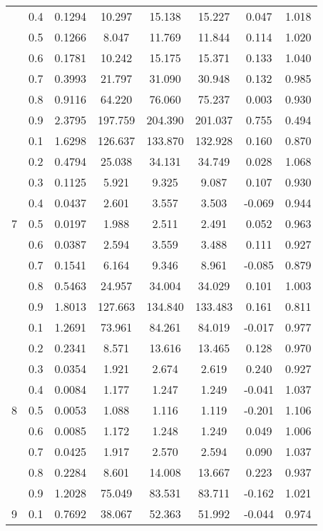 \documentclass[11pt,a4paper]{report}
\begin{document}
\begin{longtable}{ | c | c || c | c | c | c | c | c | }
 & 0.4 & 0.1294 & 10.297 & 15.138 & 15.227 & 0.047 & 1.018 \\
 & 0.5 & 0.1266 & 8.047 & 11.769 & 11.844 & 0.114 & 1.020 \\
 & 0.6 & 0.1781 & 10.242 & 15.175 & 15.371 & 0.133 & 1.040 \\
 & 0.7 & 0.3993 & 21.797 & 31.090 & 30.948 & 0.132 & 0.985 \\
 & 0.8 & 0.9116 & 64.220 & 76.060 & 75.237 & 0.003 & 0.930 \\
 & 0.9 & 2.3795 & 197.759 & 204.390 & 201.037 & 0.755 & 0.494 \\
 \hline
\multirow{9}{*}{7} & 0.1 & 1.6298 & 126.637 & 133.870 & 132.928 & 0.160 & 0.870 \\
 & 0.2 & 0.4794 & 25.038 & 34.131 & 34.749 & 0.028 & 1.068 \\
 & 0.3 & 0.1125 & 5.921 & 9.325 & 9.087 & 0.107 & 0.930 \\
 & 0.4 & 0.0437 & 2.601 & 3.557 & 3.503 & -0.069 & 0.944 \\
 & 0.5 & 0.0197 & 1.988 & 2.511 & 2.491 & 0.052 & 0.963 \\
 & 0.6 & 0.0387 & 2.594 & 3.559 & 3.488 & 0.111 & 0.927 \\
 & 0.7 & 0.1541 & 6.164 & 9.346 & 8.961 & -0.085 & 0.879 \\
 & 0.8 & 0.5463 & 24.957 & 34.004 & 34.029 & 0.101 & 1.003 \\
 & 0.9 & 1.8013 & 127.663 & 134.840 & 133.483 & 0.161 & 0.811 \\
 \hline
\multirow{9}{*}{8} & 0.1 & 1.2691 & 73.961 & 84.261 & 84.019 & -0.017 & 0.977 \\
 & 0.2 & 0.2341 & 8.571 & 13.616 & 13.465 & 0.128 & 0.970 \\
 & 0.3 & 0.0354 & 1.921 & 2.674 & 2.619 & 0.240 & 0.927 \\
 & 0.4 & 0.0084 & 1.177 & 1.247 & 1.249 & -0.041 & 1.037 \\
 & 0.5 & 0.0053 & 1.088 & 1.116 & 1.119 & -0.201 & 1.106 \\
 & 0.6 & 0.0085 & 1.172 & 1.248 & 1.249 & 0.049 & 1.006 \\
 & 0.7 & 0.0425 & 1.917 & 2.570 & 2.594 & 0.090 & 1.037 \\
 & 0.8 & 0.2284 & 8.601 & 14.008 & 13.667 & 0.223 & 0.937 \\
 & 0.9 & 1.2028 & 75.049 & 83.531 & 83.711 & -0.162 & 1.021 \\
 \hline
\multirow{9}{*}{9} & 0.1 & 0.7692 & 38.067 & 52.363 & 51.992 & -0.044 & 0.974 \\

\end{longtable}
\end{document}
